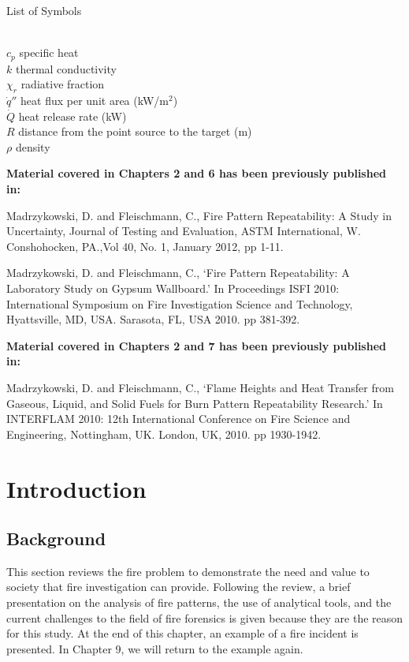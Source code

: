 \documentclass[twoside]{uocthesis}
\begin{document}
\clearpage

List of Symbols
\begin{tabbing}
\hspace{1.5in} \= \\
$c_{p}$ \> specific heat \\
$k$ \> thermal conductivity \\
$\chi_r$ \> radiative fraction \\
$\dot{q}''$ \> heat flux per unit area (kW/m$^2$) \\
$\dot{Q}$ \> heat release rate (kW) \\ 
$R$ \> distance from the point source to the target (m) \\
$\rho$ \> density \\
\end{tabbing}


\textbf{Material covered in Chapters 2 and 6 has been previously published in:}   

Madrzykowski, D. and Fleischmann, C., Fire Pattern Repeatability: A Study in Uncertainty, Journal of
Testing and Evaluation, ASTM International, W. Conshohocken, PA.,Vol 40, No. 1, January 2012, pp 1-11.

Madrzykowski, D. and Fleischmann, C., `Fire Pattern Repeatability: A Laboratory Study on Gypsum Wallboard.' In Proceedings ISFI 2010: International Symposium on Fire Investigation Science and Technology, Hyattsville, MD, USA. Sarasota, FL, USA 2010. pp 381-392.

\textbf{Material covered in Chapters 2 and 7 has been previously published in:} 

Madrzykowski, D. and Fleischmann, C., `Flame Heights and Heat Transfer from Gaseous, Liquid, and Solid Fuels for Burn Pattern Repeatability Research.' In INTERFLAM 2010: 12th International Conference on Fire Science and Engineering, Nottingham, UK. London, UK, 2010. pp 1930-1942.



\textpages

\chapter{Introduction}
\label{chapter:Introduction}
\section{Background}

This section reviews the fire problem to demonstrate the need and value to society that fire investigation can provide. Following the review, a brief presentation on the analysis  of fire patterns, the use of analytical tools, and the current challenges to the field of fire forensics is given because they are the reason for this study.  At the end of this chapter, an example of a fire incident is presented. In Chapter 9, we will return to the example again.   
\end{document}
